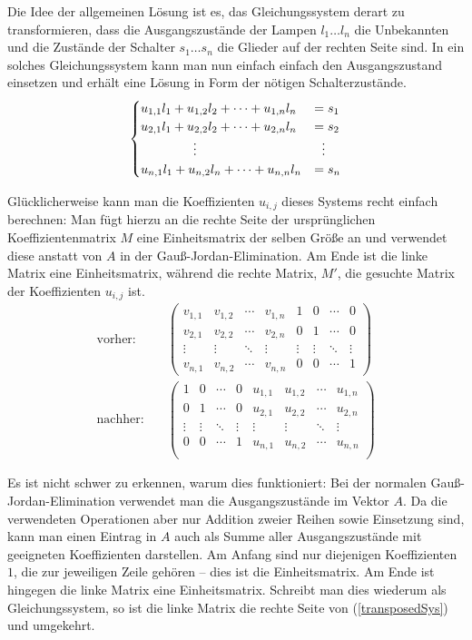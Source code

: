 \documentclass{scrartcl}
\begin{document}
Die Idee der allgemeinen Lösung ist es, das Gleichungssystem derart zu
transformieren, dass die Ausgangszustände der Lampen $l_1\dots l_n$ die
Unbekannten und die Zustände der Schalter $s_1\dots s_n$ die Glieder auf der
rechten Seite sind. In ein solches Gleichungssystem kann man nun einfach einfach
den Ausgangszustand einsetzen und erhält eine Lösung in Form der nötigen
Schalterzustände.
\begin{equation}\label{transposedSys}
\begin{cases}
  u_{1,1}l_1+u_{1,2}l_2+\dots+u_{1,n}l_n&=s_1\\
  u_{2,1}l_1+u_{2,2}l_2+\dots+u_{2,n}l_n&=s_2\\
  \hfil\vdots\hfil&\hfil\vdots\hfil\\
  u_{n,1}l_1+u_{n,2}l_n+\dots+u_{n,n}l_n&=s_n\\
\end{cases}
\end{equation}

Glücklicherweise kann man die Koeffizienten $u_{i,j}$ dieses Systems recht
einfach berechnen: Man fügt hierzu an die rechte Seite der ursprünglichen
Koeffizientenmatrix $M$ eine Einheitsmatrix der selben Größe an und verwendet
diese anstatt von $A$ in der Gauß-Jordan-Elimination. Am Ende ist die
linke Matrix eine Einheitsmatrix, während die rechte Matrix, $M'$, die gesuchte
Matrix der Koeffizienten $u_{i,j}$ ist.
\begin{align}
\text{vorher:}\quad&
\left(\begin{array}{cccc|cccc}
  v_{1,1}&v_{1,2}&\cdots&v_{1,n}&1&0&\cdots&0\\
  v_{2,1}&v_{2,2}&\cdots&v_{2,n}&0&1&\cdots&0\\
  \vdots&\vdots&\ddots&\vdots&\vdots&\vdots&\ddots&\vdots\\
  v_{n,1}&v_{n,2}&\cdots&v_{n,n}&0&0&\cdots&1
\end{array}\right)\\
\text{nachher:}\quad&
\left(\begin{array}{cccc|cccc}
  1&0&\cdots&0&u_{1,1}&u_{1,2}&\cdots&u_{1,n}\\
  0&1&\cdots&0&u_{2,1}&u_{2,2}&\cdots&u_{2,n}\\
  \vdots&\vdots&\ddots&\vdots&\vdots&\vdots&\ddots&\vdots\\
  0&0&\cdots&1&u_{n,1}&u_{n,2}&\cdots&u_{n,n}\\
\end{array}\right)
\end{align}

Es ist nicht schwer zu erkennen, warum dies funktioniert: Bei der normalen
Gauß-Jordan-Elimination verwendet man die Ausgangszustände im Vektor $A$. Da die
verwendeten Operationen aber nur Addition zweier Reihen sowie Einsetzung sind,
kann man einen Eintrag in $A$ auch als Summe aller Ausgangszustände mit
geeigneten Koeffizienten darstellen. Am Anfang sind nur diejenigen Koeffizienten
$1$, die zur jeweiligen Zeile gehören -- dies ist die Einheitsmatrix. Am Ende
ist hingegen die linke Matrix eine Einheitsmatrix. Schreibt man dies wiederum
als Gleichungssystem, so ist die linke Matrix die rechte Seite von
(\ref{transposedSys}) und umgekehrt.
\end{document}
